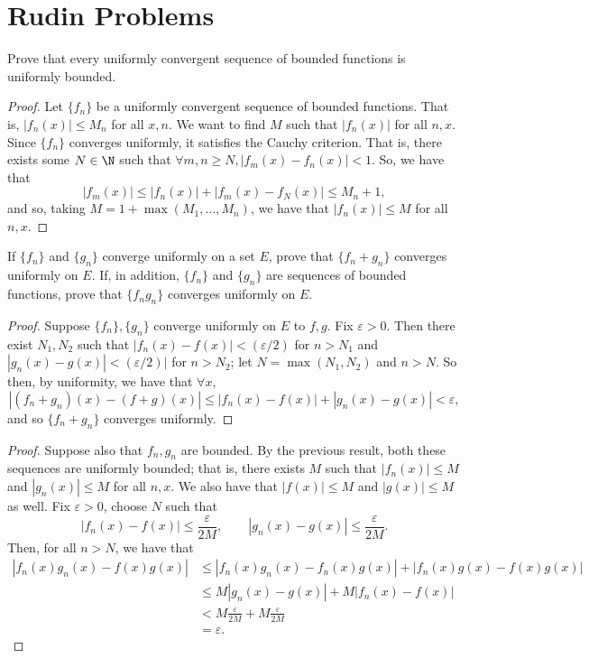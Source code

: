\documentclass{assignment}
\begin{document}
 
\maketitle
\section*{Rudin Problems}
\begin{question}[7.1*]
  Prove that every uniformly convergent sequence of bounded functions is uniformly bounded.
\end{question}
\begin{proof}
  Let $\{f_n\}$ be a uniformly convergent sequence of bounded functions. That is, $|f_n(x)| \leq
M_n$ for all $x,n$. We want to find $M$ such that $|f_n(x)|$ for all $n,x$. Since $\{f_n\}$
converges uniformly, it satisfies the Cauchy criterion. That is, there exists some $N\in\N$ such
that $\forall m,n \geq N, |f_m(x) - f_n(x)| < 1$. So, we have that 
$$|f_m(x)| \leq |f_n(x)| + |f_m(x) - f_N(x)| \leq M_n + 1,$$
and so, taking $M = 1 + \max(M_1, \ldots, M_n)$, we have that $|f_n(x)| \leq M$ for all $n,x$.
\end{proof}

\begin{question}[7.2*]
 If $\{f_n\}$ and $\{g_n\}$ converge uniformly on a set $E$, prove that $\{f_n + g_n\}$ converges
uniformly on $E$. If, in addition, $\{f_n\}$ and $\{g_n\}$ are sequences of bounded functions, prove
that $\{f_ng_n\}$ converges uniformly on $E$.
\end{question}
\begin{proof}
  Suppose $\{f_n\}, \{g_n\}$ converge uniformly on $E$ to $f,g$. Fix $\varepsilon > 0$. Then there
exist $N_1, N_2$ such that $|f_n(x) - f(x)| < (\varepsilon / 2)$ for $n > N_1$ and $|g_n(x) - g(x)|
< (\varepsilon / 2)|$ for $n > N_2$; let $N = \max(N_1, N_2)$ and $n > N$. So then, by uniformity,
we have that $\forall x$, 
$$|(f_n + g_n)(x) - (f + g)(x)| \leq |f_n(x) - f(x)| + |g_n(x) - g(x)| < \varepsilon,$$
and so $\{f_n + g_n\}$ converges uniformly.
\end{proof}
\begin{proof}
  Suppose also that $f_n, g_n$ are bounded. By the previous result, both these sequences are
uniformly bounded; that is, there exists $M$ such that $|f_n(x)| \leq M$ and $|g_n(x)| \leq M$ for
all $n,x$. We also have that $|f(x)| \leq M$ and $|g(x)| \leq M$ as well. Fix $\varepsilon > 0$,
choose $N$ such that 
$$|f_n(x) - f(x)| \leq \frac{\varepsilon}{2M}, \qquad |g_n(x) - g(x)| \leq \frac{\varepsilon}{2M}.$$
Then, for all $n > N$, we have that 
\begin{align*}
  |f_n(x)g_n(x) - f(x)g(x)| &\leq |f_n(x)g_n(x) - f_n(x)g(x)| + |f_n(x)g(x) - f(x)g(x)| \\
&\leq M|g_n(x) - g(x)| + M|f_n(x) - f(x)| \\
&< M \frac{\varepsilon}{2M} + M \frac{\varepsilon}{2M} \\
&= \varepsilon.
\end{align*}
\end{proof}
\end{document}

